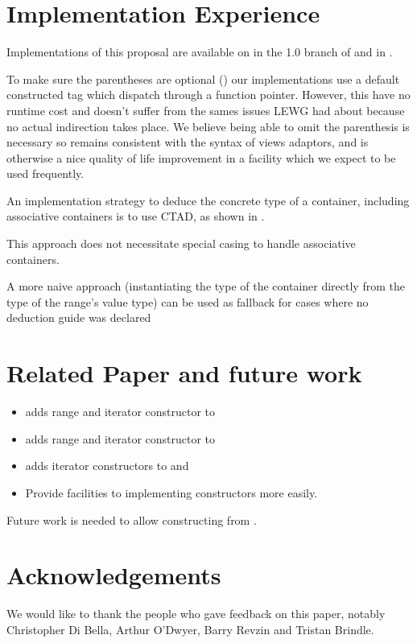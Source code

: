 \documentclass{wg21}
\begin{document}
\section{Implementation Experience}

Implementations of this proposal are available on in the 1.0 branch of \cite{Range V3} and in \cite{cmcstl2}.

To make sure the parentheses are optional () our implementations use a default constructed
tag which dispatch through a function pointer.
However, this have no runtime cost
and doesn't suffer from the sames issues LEWG had about  because no actual indirection takes place.
We believe being able to omit the parenthesis is necessary so  remains consistent with the syntax of views adaptors,
and is otherwise a nice quality of life improvement in a facility which we expect to be used frequently.

An implementation strategy to deduce the concrete type of a container, including associative containers is to use CTAD, as shown in \cite{CTAD}.

This approach does not necessitate special casing to handle associative containers.

A more naive approach (instantiating the type of the container directly from the type of the range's value type) can be used as fallback for cases where no deduction guide was declared


\section{Related Paper and future work}

\begin{itemize}
	\item \cite{P1391} adds range and iterator constructor to 
	\item \cite{P1394} adds range and iterator constructor to 
    \item \cite{P1425} adds iterator constructors to  and 
    \item \cite{P1419} Provide facilities to implementing  constructors more easily.
\end{itemize}

Future work is needed to allow constructing  from .

\section{Acknowledgements}
We would like to thank the people who gave feedback on this paper, notably Christopher Di Bella, Arthur O'Dwyer, Barry Revzin
and Tristan Brindle.\\
\end{document}
